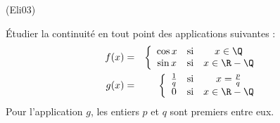 \begin{tiny}(Eli03)\end{tiny} \'Etudier la continuit{\'e} en tout point des applications suivantes :
\begin{eqnarray*}
f(x) &=&\left\{
\begin{array}{ccc}
\cos x & \text{si} & x\in \Q \\
\sin x & \text{si} & x\in \R-\Q
\end{array}
\right.  \\
g(x) &=&\left\{
\begin{array}{ccc}
\frac{1}{q} & \text{si} & x=\frac{p}{q} \\
0 & \text{si} & x\in \R-\Q
\end{array}
\right.
\end{eqnarray*}
\newline
Pour l'application $g$, les entiers $p$ et $q$ sont premiers entre
eux.
